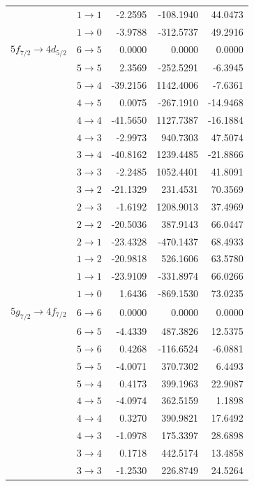 \begin{longtable}{c c | r r r}
& $1 \rightarrow 1$ & -2.2595 & -108.1940 & 44.0473 \\
& $1 \rightarrow 0$ & -3.9788 & -312.5737 & 49.2916 \\[7pt]
$5f_{7/2} \rightarrow 4d_{5/2}$ & $6 \rightarrow 5$ & 0.0000 & 0.0000 & 0.0000 \\
& $5 \rightarrow 5$ & 2.3569 & -252.5291 & -6.3945 \\
& $5 \rightarrow 4$ & -39.2156 & 1142.4006 & -7.6361 \\
& $4 \rightarrow 5$ & 0.0075 & -267.1910 & -14.9468 \\
& $4 \rightarrow 4$ & -41.5650 & 1127.7387 & -16.1884 \\
& $4 \rightarrow 3$ & -2.9973 & 940.7303 & 47.5074 \\
& $3 \rightarrow 4$ & -40.8162 & 1239.4485 & -21.8866 \\
& $3 \rightarrow 3$ & -2.2485 & 1052.4401 & 41.8091 \\
& $3 \rightarrow 2$ & -21.1329 & 231.4531 & 70.3569 \\
& $2 \rightarrow 3$ & -1.6192 & 1208.9013 & 37.4969 \\
& $2 \rightarrow 2$ & -20.5036 & 387.9143 & 66.0447 \\
& $2 \rightarrow 1$ & -23.4328 & -470.1437 & 68.4933 \\
& $1 \rightarrow 2$ & -20.9818 & 526.1606 & 63.5780 \\
& $1 \rightarrow 1$ & -23.9109 & -331.8974 & 66.0266 \\
& $1 \rightarrow 0$ & 1.6436 & -869.1530 & 73.0235 \\[7pt]
$5g_{7/2} \rightarrow 4f_{7/2}$ & $6 \rightarrow 6$ & 0.0000 & 0.0000 & 0.0000 \\
& $6 \rightarrow 5$ & -4.4339 & 487.3826 & 12.5375 \\
& $5 \rightarrow 6$ & 0.4268 & -116.6524 & -6.0881 \\
& $5 \rightarrow 5$ & -4.0071 & 370.7302 & 6.4493 \\
& $5 \rightarrow 4$ & 0.4173 & 399.1963 & 22.9087 \\
& $4 \rightarrow 5$ & -4.0974 & 362.5159 & 1.1898 \\
& $4 \rightarrow 4$ & 0.3270 & 390.9821 & 17.6492 \\
& $4 \rightarrow 3$ & -1.0978 & 175.3397 & 28.6898 \\
& $3 \rightarrow 4$ & 0.1718 & 442.5174 & 13.4858 \\
& $3 \rightarrow 3$ & -1.2530 & 226.8749 & 24.5264 \\

\end{longtable}

